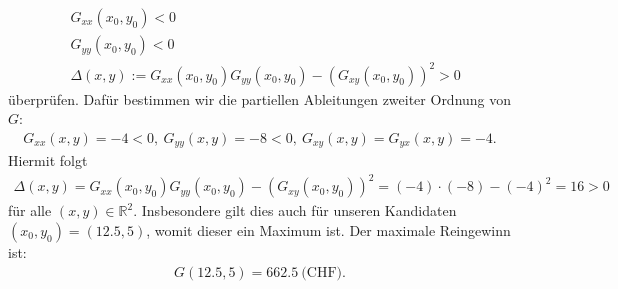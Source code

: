 \begin{align*}
	&G_{xx}(x_0,y_0) < 0 \\
	&G_{yy}(x_0,y_0) < 0\\
	&\Delta(x,y) := G_{xx}(x_0,y_0)G_{yy}(x_0,y_0)-(G_{xy}(x_0,y_0))^2 > 0
\end{align*}
überprüfen. Dafür bestimmen wir die partiellen Ableitungen zweiter Ordnung von $ G $:
\begin{align*}
	G_{xx}(x,y) = -4 < 0, \
	G_{yy}(x,y) = -8 < 0, \ 
	G_{xy}(x,y) = G_{yx}(x,y) = -4.
\end{align*}
Hiermit folgt
\begin{align*}
	\Delta(x,y) = G_{xx}(x_0,y_0)G_{yy}(x_0,y_0)-(G_{xy}(x_0,y_0))^2
	= (-4)\cdot(-8) - (-4)^2 = 16  >0
\end{align*}
für alle $ (x,y) \in \mathbb{R}^2 $. Insbesondere gilt dies auch für unseren Kandidaten $ (x_0,y_0) = (12.5,5) $, womit dieser ein Maximum ist. Der maximale Reingewinn ist:
\begin{align*}
	G(12.5,5) = 662.5 \ \textrm{(CHF)}.
\end{align*} 





\newpage


